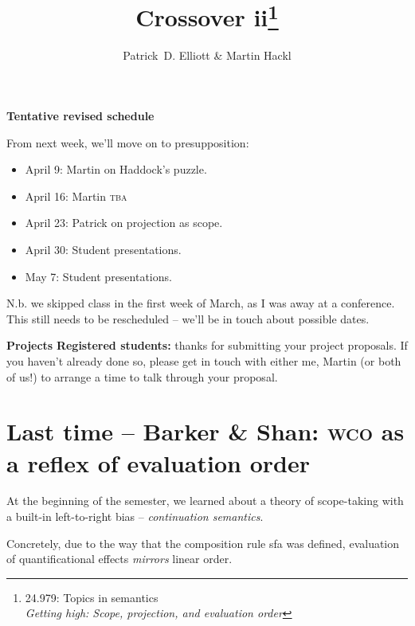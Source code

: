 \documentclass[nols,twoside,nofonts,nobib,nohyper]{tufte-handout}
\title{Crossover ii\thanks{24.979: Topics in
    semantics\\\noindent\textit{Getting high: Scope, projection, and evaluation order}}}
\author[Patrick D. Elliott and Martin Hackl]{Patrick~D. Elliott \& Martin Hackl}
\begin{document}
\maketitle%

\begin{tcolorbox}{\textbf{Tentative revised schedule}}
  \tcblower

  From next week, we'll move on to presupposition:

  \begin{itemize}

      \item April 9: Martin on Haddock's puzzle.

      \item April 16: Martin \textsc{tba}

      \item April 23: Patrick on projection as scope.

      \item April 30: Student presentations.

      \item May 7: Student presentations.

  \end{itemize}

  N.b. we skipped class in the first week of March, as I was away at a
  conference. This still needs to be rescheduled -- we'll be in touch about
  possible dates.

\end{tcolorbox}

\begin{tcolorbox}
  \textbf{Projects}
  \tcblower
  \textbf{Registered students:} thanks for submitting your project proposals. If
  you haven't already done so, please get in touch with either me, Martin (or
  both of us!) to arrange a time to talk through your proposal.
\end{tcolorbox}

\section{Last time -- Barker \& Shan: \textsc{wco} as a reflex of evaluation order}

At the beginning of the semester, we learned about a theory of scope-taking with
a built-in left-to-right bias -- \textit{continuation semantics}.

Concretely, due to the way that the composition rule \ac{sfa} was defined,
evaluation of quantificational effects \textit{mirrors} linear
order.
\end{document}
